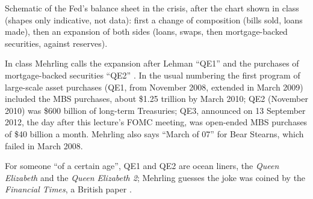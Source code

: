 \begin{paracol}{2}
\begin{nfigure}
\caption{Schematic of the Fed's balance sheet in the crisis, after the chart shown in class  (shapes only
indicative, not data): first a change of composition (bills sold, loans made), then an expansion of both sides (loans, swaps,
then mortgage-backed securities, against reserves).}\label{fig:st-fedbs}
\end{nfigure}

\begin{coursenote}[QE1, QE2, QE3]
In class Mehrling calls the expansion after Lehman ``QE1'' and the purchases of mortgage-backed securities ``QE2''
. In the usual numbering the first program of large-scale asset purchases (QE1, from
November 2008, extended in March 2009) included the MBS purchases, about \$1.25 trillion by March 2010; QE2 (November
2010) was \$600 billion of long-term Treasuries; QE3, announced on 13 September 2012, the day after this lecture's FOMC
meeting, was open-ended MBS purchases of \$40 billion a month. Mehrling also says ``March of 07'' for Bear Stearns, which
failed in March 2008.
\end{coursenote}\begin{aside}[Why ``QE1'']
For someone ``of a certain age'', QE1 and QE2 are ocean liners, the \emph{Queen Elizabeth} and the \emph{Queen Elizabeth 2};
Mehrling guesses the joke was coined by the \emph{Financial Times}, a British paper .
\end{aside}


\end{paracol}
